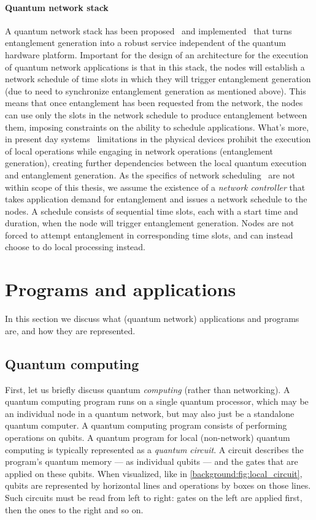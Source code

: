 \paragraph{Quantum network stack}
A quantum network stack has been proposed~\cite{dahlberg2019link} and implemented~\cite{pompili2022experimental} that turns entanglement generation into a robust service independent of the quantum hardware platform.
Important for the design of an architecture for the execution of quantum network applications is that in this stack, the nodes will establish a network schedule of time slots in which they will trigger entanglement generation (due to need to synchronize entanglement generation as mentioned above).
This means that once entanglement has been requested from the network, the nodes can use only the slots in the network schedule to produce entanglement between them, imposing constraints on the ability to schedule applications. What's more, in present day systems~\cite{pompili2021realization, krutyanskiy2023entanglement} limitations in the physical devices prohibit the execution of local operations while engaging in network operations (entanglement generation), creating further dependencies between the local quantum execution and entanglement generation. 
As the specifics of network scheduling~\cite{network-scheduling, skrzypczyk2021architecture} are not within scope of this thesis, we assume the existence of a \textit{network controller} that takes application demand for entanglement and issues a network schedule to the nodes. 
A schedule consists of sequential time slots, each with a start time and duration, when the node will trigger entanglement generation.
Nodes are not forced to attempt entanglement in corresponding time slots, and can instead choose to do local processing instead.




\section{Programs and applications}
\label{background:sec:applications}

In this section we discuss what (quantum network) applications and programs are, and how they are represented.

\subsection{Quantum computing}
First, let us briefly discuss quantum \emph{computing} (rather than networking).
A quantum computing program runs on a single quantum processor, which may be an individual node in a quantum network, but may also just be a standalone quantum computer.
A quantum computing program consists of performing operations on qubits.
A quantum program for local (non-network) quantum computing is typically represented as a \emph{quantum circuit}.
A circuit describes the program's quantum memory --- as individual qubits --- and the gates that are applied on these qubits.
When visualized, like in \cref{background:fig:local_circuit}, qubits are represented by horizontal lines and operations by boxes on those lines.
Such circuits must be read from left to right: gates on the left are applied first, then the ones to the right and so on.

